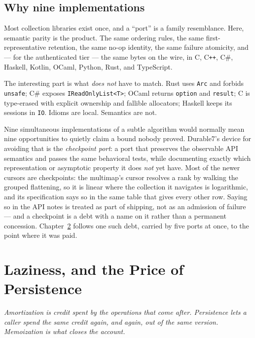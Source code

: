 \documentclass[11pt,twoside,openright]{book}
\newcommand{\code}[1]{\texorpdfstring{\textcolor{d7ink}{\texttt{#1}}}{#1}}
\newcommand{\term}[1]{\textit{#1}}
\newcommand{\motto}[1]{%
  \begingroup
  \vspace{-4pt}\hfill\begin{minipage}{0.80\textwidth}
    \raggedleft\itshape\color{d7slate}\small #1\par
  \end{minipage}\par\vspace{18pt}
  \endgroup}
\begin{document}
\section{Why nine implementations}

Most collection libraries exist once, and a ``port'' is a family resemblance.
Here, semantic parity is the product. The same ordering rules, the same
first-representative retention, the same no-op identity, the same failure
atomicity, and --- for the authenticated tier --- the same bytes on the wire, in
C, C\texttt{++}, C\#, Haskell, Kotlin, OCaml, Python, Rust, and TypeScript.

The interesting part is what \emph{does not} have to match. Rust uses
\code{Arc} and forbids \code{unsafe}; C\# exposes \code{IReadOnlyList<T>};
OCaml returns \code{option} and \code{result}; C is type-erased with explicit
ownership and fallible allocators; Haskell keeps its sessions in \code{IO}.
Idioms are local. Semantics are not.

\begin{asidebox}
Nine simultaneous implementations of a subtle algorithm would normally mean nine
opportunities to quietly claim a bound nobody proved. Durable7's device for
avoiding that is the \term{checkpoint port}: a port that preserves the
observable API semantics and passes the same behavioral tests, while
documenting exactly which representation or asymptotic property it does
\emph{not} yet have. Most of the newer cursors are
checkpoints: the multimap's cursor resolves a rank by walking the grouped
flattening, so it is linear where the collection it navigates is logarithmic, and
its specification says so in the same table that gives every other row. Saying so
in the API notes is treated as part of shipping, not as an admission of failure
--- and a checkpoint is a debt with a name on it rather than a permanent
concession. Chapter~\ref{ch:laziness} follows one such debt, carried by five
ports at once, to the point where it was paid.
\end{asidebox}

\chapter{Laziness, and the Price of Persistence}
\label{ch:laziness}

\motto{Amortization is credit spent by the operations that come after.
Persistence lets a caller spend the same credit again, and again, out of the
same version. Memoization is what closes the account.}
\end{document}
